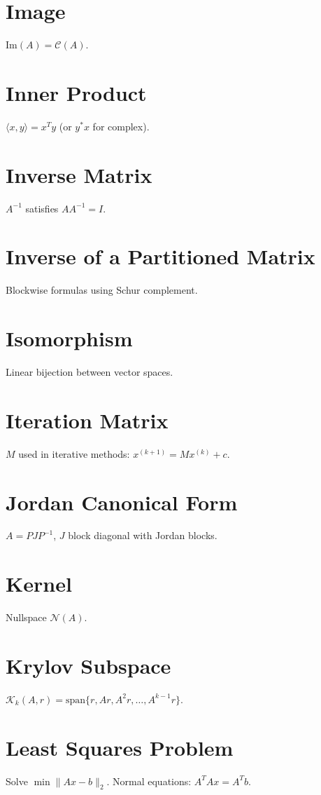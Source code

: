 \documentclass[12pt]{book}
\begin{document}
\chapter{Image}
$\mathrm{Im}(A) = \mathcal{C}(A)$.

\chapter{Inner Product}
$\langle x,y \rangle = x^Ty$ (or $y^* x$ for complex).

\chapter{Inverse Matrix}
$A^{-1}$ satisfies $AA^{-1}=I$.

\chapter{Inverse of a Partitioned Matrix}
Blockwise formulas using Schur complement.

\chapter{Isomorphism}
Linear bijection between vector spaces.

\chapter{Iteration Matrix}
$M$ used in iterative methods: $x^{(k+1)} = M x^{(k)} + c$.

\chapter{Jordan Canonical Form}
$A = P J P^{-1}$, $J$ block diagonal with Jordan blocks.

\chapter{Kernel}
Nullspace $\mathcal{N}(A)$.

\chapter{Krylov Subspace}
$\mathcal{K}_k(A,r) = \mathrm{span}\{r, Ar, A^2 r, \dots, A^{k-1}r\}$.

\chapter{Least Squares Problem}
Solve $\min \|Ax-b\|_2$. Normal equations: $A^TAx=A^Tb$.
\end{document}
